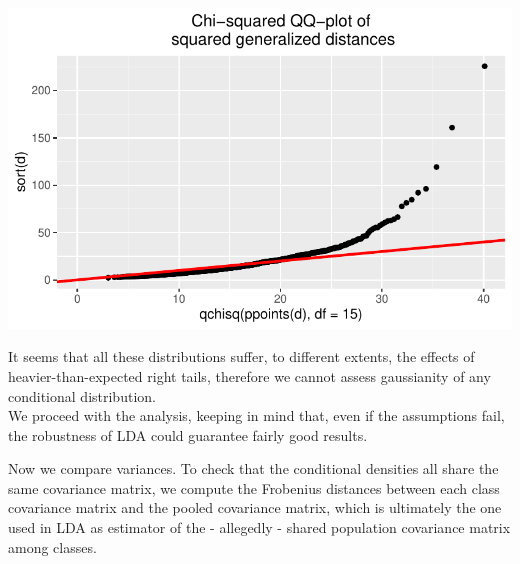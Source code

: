 \documentclass[
  letterpaper,
  DIV=11,
  numbers=noendperiod]{scrartcl}
\begin{document}
\includegraphics{ProblemSet2_files/figure-pdf/unnamed-chunk-63-1.pdf}

It seems that all these distributions suffer, to different extents, the
effects of heavier-than-expected right tails, therefore we cannot assess
gaussianity of any conditional distribution.\\
We proceed with the analysis, keeping in mind that, even if the
assumptions fail, the robustness of LDA could guarantee fairly good
results.

Now we compare variances. To check that the conditional densities all
share the same covariance matrix, we compute the Frobenius distances
between each class covariance matrix and the pooled covariance matrix,
which is ultimately the one used in LDA as estimator of the - allegedly
- shared population covariance matrix among classes.
\end{document}
